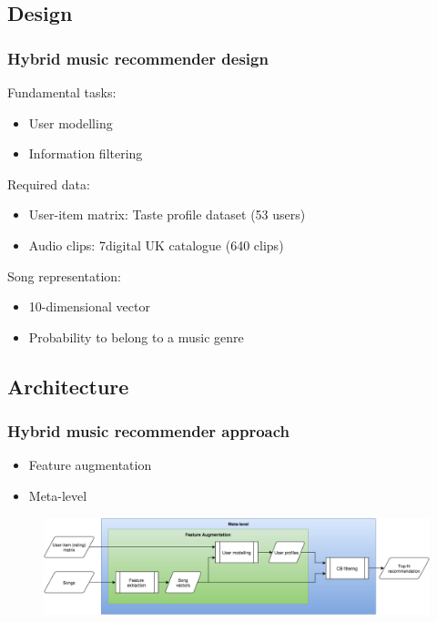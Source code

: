\documentclass{beamer}
\begin{document}
\subsection{Design}
\begin{frame}
\frametitle{Hybrid music recommender design}
Fundamental tasks:
\begin{itemize}
	\item User modelling
	\item Information filtering
\end{itemize}
Required data:
\begin{itemize}
	\item User-item matrix: Taste profile dataset (53 users)
	\item Audio clips: 7digital UK catalogue (640 clips)
\end{itemize}
Song representation:
\begin{itemize}
	\item 10-dimensional vector
	\item Probability to belong to a music genre
\end{itemize}


\end{frame}

\subsection{Architecture}
\begin{frame}
	\frametitle{Hybrid music recommender approach}
	\begin{itemize}
		\item Feature augmentation
		\item Meta-level
	\end{itemize}
	\begin{figure}[ht!]
		\centering
		\includegraphics[width=\textwidth]{hybrid.png}
	\end{figure}
\end{frame}
\end{document}
